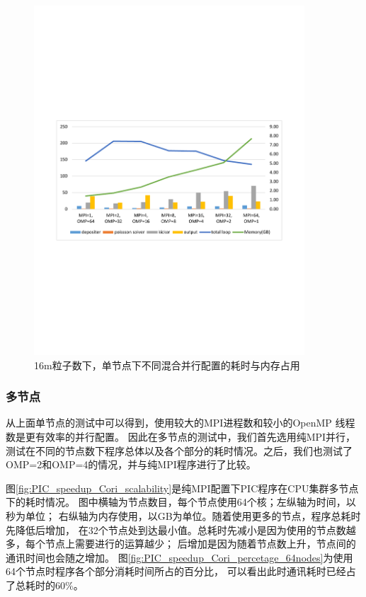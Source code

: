 \begin{figure}[!htb]
  \centering
  \includegraphics[width=0.9\textwidth]{Img/PIC_speedup_Cori_1node_16m.pdf}
  \caption{16m粒子数下，单节点下不同混合并行配置的耗时与内存占用}
  \label{fig:PIC_speedup_Cori_1node_16m}
\end{figure}


\subsubsection{多节点}
从上面单节点的测试中可以得到，使用较大的MPI进程数和较小的OpenMP 线程数是更有效率的并行配置。
因此在多节点的测试中，我们首先选用纯MPI并行，测试在不同的节点数下程序总体以及各个部分的耗时情况。之后，我们也测试了OMP=2和OMP=4的情况，并与纯MPI程序进行了比较。

图\ref{fig:PIC_speedup_Cori_scalability}是纯MPI配置下PIC程序在CPU集群多节点下的耗时情况。
图中横轴为节点数目，每个节点使用64个核；左纵轴为时间，以秒为单位；
右纵轴为内存使用，以GB为单位。随着使用更多的节点，程序总耗时先降低后增加，
在32个节点处到达最小值。总耗时先减小是因为使用的节点数越多，每个节点上需要进行的运算越少；
后增加是因为随着节点数上升，节点间的通讯时间也会随之增加。
图\ref{fig:PIC_speedup_Cori_percetage_64nodes}为使用64个节点时程序各个部分消耗时间所占的百分比，
可以看出此时通讯耗时已经占了总耗时的60\%。

